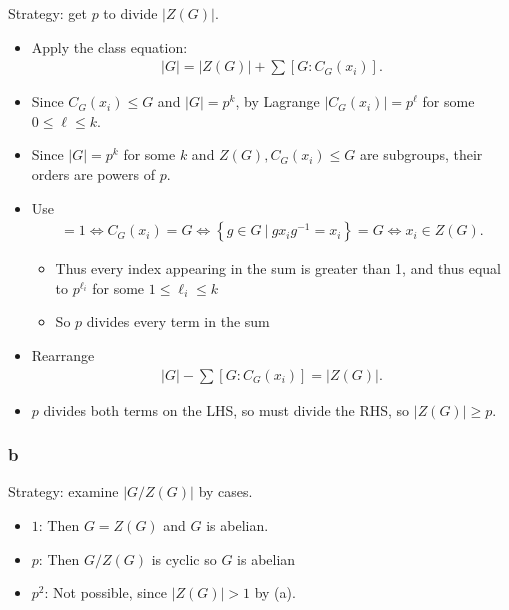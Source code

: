 \begin{solution}
Strategy: get \(p\) to divide \({\left\lvert {Z(G)} \right\rvert}\).

\begin{itemize}
\item
  Apply the class equation:
  \begin{align*}
  {\left\lvert {G} \right\rvert} = {\left\lvert {Z(G)} \right\rvert} + \sum [G: C_G(x_i)]
  .\end{align*}
\item
  Since \(C_G(x_i) \leq G\) and
  \({\left\lvert {G} \right\rvert} = p^k\), by Lagrange
  \({\left\lvert {C_G(x_i)} \right\rvert} = p^\ell\) for some
  \(0\leq \ell \leq k\).
\item
  Since \({\left\lvert {G} \right\rvert} = p^k\) for some \(k\) and
  \(Z(G), C_G(x_i) \leq G\) are subgroups, their orders are powers of
  \(p\).
\item
  Use
  \begin{align*}[G: C_G(x_i)] = 1 \iff C_G(x_i) = G \iff \left\{{g\in G{~\mathrel{\Big|}~}gx_ig^{-1}= x_i}\right\} = G \iff x_i \in Z(G).\end{align*}

  \begin{itemize}
  \tightlist
  \item
    Thus every index appearing in the sum is greater than 1, and thus
    equal to \(p^{\ell_i}\) for some \(1\leq \ell_i \leq k\)
  \item
    So \(p\) divides every term in the sum
  \end{itemize}
\item
  Rearrange
  \begin{align*}
  {\left\lvert {G} \right\rvert} -  \sum [G: C_G(x_i)]
  = {\left\lvert {Z(G)} \right\rvert} 
  .\end{align*}
\item
  \(p\) divides both terms on the LHS, so must divide the RHS, so
  \({\left\lvert {Z(G)} \right\rvert} \geq p\).
\end{itemize}

\hypertarget{b-20}{%
\subsubsection{b}\label{b-20}}

Strategy: examine \({\left\lvert {G/Z(G)} \right\rvert}\) by cases.

\begin{itemize}
\tightlist
\item
  \(1\): Then \(G = Z(G)\) and \(G\) is abelian.
\item
  \(p\): Then \(G/Z(G)\) is cyclic so \(G\) is abelian
\item
  \(p^2\): Not possible, since \({\left\lvert {Z(G)} \right\rvert} > 1\)
  by (a).
\end{itemize}


\end{solution}

